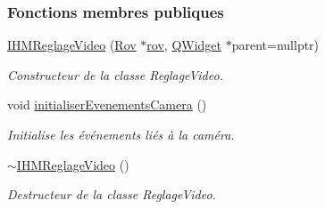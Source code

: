 \subsubsection*{Fonctions membres publiques}
\begin{DoxyCompactItemize}
\item 
\hyperlink{class_i_h_m_reglage_video_aa057ded6ad29a2d7fd117a8e9336c3ad}{I\+H\+M\+Reglage\+Video} (\hyperlink{class_rov}{Rov} $\ast$\hyperlink{class_i_h_m_reglage_video_a755736fe361e651453de6bc21725a626}{rov}, \hyperlink{class_q_widget}{Q\+Widget} $\ast$parent=nullptr)
\begin{DoxyCompactList}\small\item\em Constructeur de la classe Reglage\+Video. \end{DoxyCompactList}\item 
void \hyperlink{class_i_h_m_reglage_video_aba318ba2789177dafcf2651f95603435}{initialiser\+Evenements\+Camera} ()
\begin{DoxyCompactList}\small\item\em Initialise les événements liés à la caméra. \end{DoxyCompactList}\item 
\hyperlink{class_i_h_m_reglage_video_aaf105e0ca892a751632170a3a083dfec}{$\sim$\+I\+H\+M\+Reglage\+Video} ()
\begin{DoxyCompactList}\small\item\em Destructeur de la classe Reglage\+Video. \end{DoxyCompactList}\end{DoxyCompactItemize}
